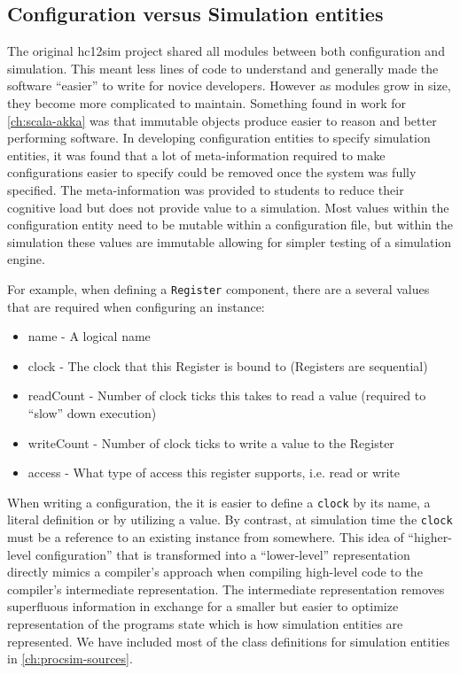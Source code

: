 \subsection{Configuration versus Simulation entities}
\label{sec:lua:sec:configuration-vs-simulation}

The original hc12sim project shared all modules between both configuration and simulation. This meant less lines of code to understand and generally made the software ``easier'' to write for novice developers. However as modules grow in size, they become more complicated to maintain. Something found in work for \cref{ch:scala-akka} was that immutable objects produce easier to reason and better performing software. In developing configuration entities to specify simulation entities, it was found that a lot of meta-information required to make configurations easier to specify could be removed once the system was fully specified. The meta-information was provided to students to reduce their cognitive load but does not provide value to a simulation. Most values within the configuration entity need to be mutable within a configuration file, but within the simulation these values are immutable allowing for simpler testing of a simulation engine.

For example, when defining a \texttt{Register} component, there are a several values that are required when configuring an instance: 
\begin{itemize}
\item name - A logical name
\item clock - The clock that this Register is bound to (Registers are sequential)
\item readCount - Number of clock ticks this takes to read a value (required to ``slow'' down execution)
\item writeCount - Number of clock ticks to write a value to the Register
\item access - What type of access this register supports, i.e. read or write
\end{itemize}
When writing a configuration, the it is easier to define a \texttt{clock} by its name, a literal definition or by utilizing a  value. By contrast, at simulation time the \texttt{clock} must be a reference to an existing instance from somewhere. This idea of ``higher-level configuration'' that is transformed into a ``lower-level'' representation directly mimics a compiler's approach when compiling high-level code to the compiler's intermediate representation. The intermediate representation removes superfluous information in exchange for a smaller but easier to optimize representation of the programs state which is how simulation entities are represented. We have included most of the class definitions for simulation entities in \cref{ch:procsim-sources}.

